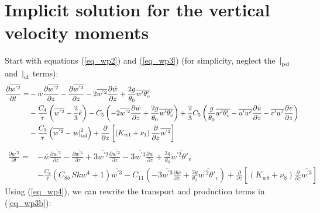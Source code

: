 \documentclass[11pt,fleqn]{article}
\newcommand{\ptlder}[2]{\frac{\partial #1}{\partial #2}}
\begin{document}
\section{Implicit solution for the vertical velocity moments}

Start with equations (\ref{eq_wp2}) and (\ref{eq_wp3}) (for simplicity, neglect 
the $\left.\right|_{\rm{pd}}$ and $\left.\right|_{\rm{cl}}$ terms):
%
\begin{equation}
\label{eq_wp2b}
\begin{split}
\ptlder{\overline{w^{'2}}}{t} 
=& - \bar{w}\ptlder{\overline{w^{'2}}}{z}	 
   - \ptlder{\overline{w^{'3}}}{z} 
   - 2\overline{w^{'2}}\ptlder{\bar{w}}{z}
   + \frac{2g}{\theta_0} \overline{w'\theta'_v} \\
 & - \frac{C_4}{\tau} \left( \overline{w^{'2}} -\frac{2}{3}\bar{e} \right)
   - C_5 
     \left(
       - 2\overline{w^{'2}}\ptlder{\bar{w}}{z}
       + \frac{2g}{\theta_0} \overline{w'\theta'_v}
     \right)
   + \frac{2}{3} C_5
     \left(
       \frac{g}{\theta_0} \overline{w'\theta'_v} 
       - \overline{u'w'}\ptlder{\bar{u}}{z} 
       - \overline{v'w'}\ptlder{\bar{v}}{z} 
     \right) \\
 & - \dfrac{C_1}{\tau} \left(   \overline{w^{'2}} 
                              - \left. w \right|_{\rm{tol}}^{2} \right)
   + \ptlder{}{z} \left[ \left( K_{w1} + \nu_1 \right)
                         \ptlder{}{z} \overline{w^{'2}} 
                  \right]
\end{split}
\end{equation}
%
\begin{equation}
\label{eq_wp3b}
\begin{split}
\ptlder{\overline{w^{'3}}}{t}
= & - \bar{w}\ptlder{\overline{w^{'3}}}{z}
    - \ptlder{\overline{w^{'4}}}{z} 
    + 3\overline{w^{'2}}\ptlder{\overline{w^{'2}}}{z}
    - 3\overline{w^{'3}}\ptlder{\bar{w}}{z}
    + \frac{3g}{\theta_0} \overline{w^{'2}\theta'_v} \\
  & - \frac{C_8}{\tau}\left( C_{8b} \, Skw^4 + 1 \right) \overline{w^{'3}}
    - C_{11} \left(
                - 3 \overline{w^{'3}}\ptlder{\bar{w}}{z}
                + \frac{3g}{\theta_0} \overline{w^{'2}\theta'_v}
             \right)
    + \ptlder{}{z} \left[ \left( K_{w8} + \nu_8 \right)
                          \ptlder{}{z} \overline{w^{'3}} 
                   \right]
\end{split}
\end{equation}
%
Using (\ref{eq_wp4}), we can rewrite the transport and production terms
in (\ref{eq_wp3b}):
\end{document}
